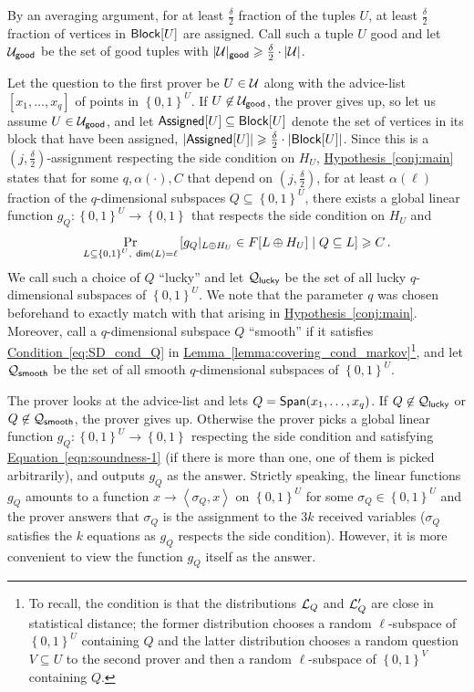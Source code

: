 \documentclass[11pt]{article}
\numberwithin{equation}{section}
\theoremstyle{definition}
\theoremstyle{plain}
\newcommand{\expref}[2]{\hyperref[#2]{#1~\ref{#2}}}
\newcommand{\expeqref}[2]{\hyperref[#2]{#1~\eqref{#2}}}
\newcommand\set[1]{{\left\{ #1 \right\}}}
\newcommand\Prob[2]{{\Pr_{#1}\left[ {#2} \right]}}
\newcommand\power[1]{\set{0,1}^{#1}}
\newcommand*\xor{\mathbin{\oplus}}
\renewcommand\geq{\geqslant}
\begin{document}
By an averaging argument, for at least $\frac{\delta}{2}$ fraction of the tuples $U$,
at least $\frac{\delta}{2}$ fraction of vertices in ${\sf Block}[U]$ are assigned. Call such a tuple $U$ good and let ${\cal U}_{\sf good}$ be
the set of good tuples with $|{\cal U}|_{\sf good} \geq \frac{\delta}{2} \cdot |{\cal U}|$.

Let the question to the first prover be $U \in {\cal U}$ along with the advice-list  $[x_1, \ldots, x_q]$ of points in $\power{U}$. If
$U \not\in {\cal U}_{\sf good}$, the prover gives up, so let us assume $U \in {\cal U}_{\sf good}$, and
let ${\sf Assigned}[U] \subseteq {\sf Block}[U]$ denote the set of vertices in its block that have been assigned,
$|{\sf Assigned}[U]| \geq \frac{\delta}{2} \cdot |{\sf Block}[U]|$. Since this is a $(j,\frac{\delta}{2})$-assignment respecting the
side condition on $H_U$, \expref{Hypothesis}{conj:main} states that for some $q, \alpha(\cdot), C$ that depend on $(j,\frac{\delta}{2})$, for
at least $\alpha(\ell)$ fraction of the $q$-dimensional subspaces $Q \subseteq \power{U}$,
there exists a global linear
function $g_Q : \power{U} \to \power{}$ that respects the side condition on $H_U$ and
\begin{equation} \label{eqn:soundness-1}  
  \Prob{L \subseteq \power{U}, ~{\sf dim}(L)=\ell}{g_Q|_{L\xor H_U}  \in F[L\xor H_U] \mid Q \subseteq L}\geqslant C\,.%
\end{equation}
We call such a choice of $Q$ ``lucky'' and let ${\cal Q}_{\sf lucky}$ be the set of all lucky $q$-dimensional subspaces of
$\power{U}$.  We note that the parameter $q$ was chosen beforehand to exactly match with that arising in \expref{Hypothesis}{conj:main}.
Moreover, call a $q$-dimensional subspace $Q$ ``smooth'' if it satisfies \expeqref{Condition}{eq:SD_cond_Q} in \expref{Lemma}{lemma:covering_cond_markov}\footnote{To recall,
the condition is that the distributions ${\cal L}_Q$ and ${\cal L}'_Q$ are close in statistical distance; the former distribution
chooses a random $\ell$-subspace of $\power{U}$ containing $Q$ and the latter distribution chooses a random question $V \subseteq U$ to the
second prover and then a random $\ell$-subspace of $\power{V}$ containing $Q$.}, and let ${\cal Q}_{\sf smooth}$ be the set of all smooth
$q$-dimensional subspaces of
$\power{U}$.

The prover looks at the advice-list and lets $Q = {\sf Span}(x_1,\ldots, x_q)$. If $Q \not\in {\cal Q}_{\sf lucky}$ or
$Q \not\in {\cal Q}_{\sf smooth}$,  the prover
gives up. Otherwise the prover picks a global linear function $g_Q:\power{U} \to \power{}$ respecting the side condition and satisfying \expeqref{Equation}{eqn:soundness-1}
(if there is more than one, one of them is picked arbitrarily), and outputs $g_Q$ as the answer. Strictly speaking,
 the linear functions $g_Q$  amounts to a function
$x \to \left< \sigma_Q, x\right> $ on $\power{U}$ for some $\sigma_Q \in \power{U}$ and the prover answers that $\sigma_Q$ is the
assignment to the $3k$ received variables ($\sigma_Q$ satisfies the $k$ equations as $g_Q$ respects the side condition). However, it
is more convenient to view the function $g_Q$ itself as the answer.
\end{document}
